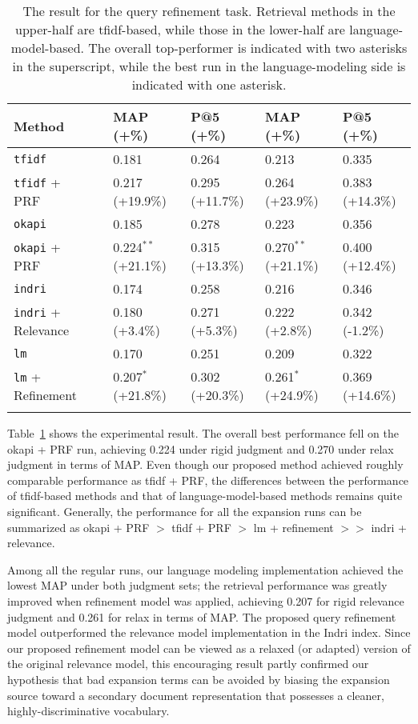 \begin{table}[ht!]
  \centering
  \begin{tabular}{llllll}
    Method & & MAP (+\%) & P@5 (+\%) & MAP (+\%) & P@5 (+\%) \\
    \hline
    {\tt tfidf} & & 0.181 & 0.264 & 0.213 & 0.335 \\
    {\tt tfidf} + PRF & & 0.217 (+19.9\%) & 0.295 (+11.7\%) & 0.264 (+23.9\%) & 0.383 (+14.3\%) \\
    {\tt okapi} & & 0.185 & 0.278 & 0.223 & 0.356 \\
    {\tt okapi} + PRF & & 0.224$^{**}$ (+21.1\%) & 0.315 (+13.3\%) & 0.270$^{**}$ (+21.1\%) & 0.400 (+12.4\%) \\
    \hline
    {\tt indri} & & 0.174 & 0.258 & 0.216 & 0.346 \\
    {\tt indri} + Relevance & & 0.180 (+3.4\%) & 0.271 (+5.3\%) & 0.222 (+2.8\%) & 0.342 (-1.2\%) \\
    {\tt lm} & & 0.170 & 0.251 & 0.209 & 0.322 \\
    {\tt lm} + Refinement & & 0.207$^*$ (+21.8\%) & 0.302 (+20.3\%) & 0.261$^*$ (+24.9\%) & 0.369 (+14.6\%) \\
    \\
  \end{tabular}

  \caption{The result for the query refinement task.  Retrieval methods in the
  upper-half are tfidf-based, while those in the lower-half are
  language-model-based.  The overall top-performer is indicated with two
  asterisks in the superscript, while the best run in the language-modeling
  side is indicated with one asterisk.}
  \label{t:query-modeling}
\end{table}

Table~\ref{t:query-modeling} shows the experimental result.  The overall best
performance fell on the okapi + PRF run, achieving 0.224 under rigid judgment
and 0.270 under relax judgment in terms of MAP.  Even though our proposed
method achieved roughly comparable performance as tfidf + PRF, the differences
between the performance of tfidf-based methods and that of language-model-based
methods remains quite significant.  Generally, the performance for all the
expansion runs can be summarized as okapi + PRF $>$ tfidf + PRF $>$ lm + refinement
$>>$ indri + relevance.

Among all the regular runs, our language modeling implementation achieved the
lowest MAP under both judgment sets; the retrieval performance was greatly
improved when refinement model was applied, achieving 0.207 for rigid relevance
judgment and 0.261 for relax in terms of MAP.  The proposed query refinement
model outperformed the relevance model implementation in the Indri index.
Since our proposed refinement model can be viewed as a relaxed (or adapted)
version of the original relevance model, this encouraging result partly
confirmed our hypothesis that bad expansion terms can be avoided by biasing the
expansion source toward a secondary document representation that possesses a
cleaner, highly-discriminative vocabulary.  

